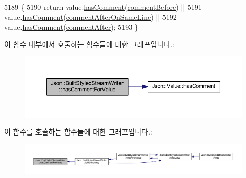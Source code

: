 \begin{DoxyCode}
5189                                                                    \{
5190   \textcolor{keywordflow}{return} value.\hyperlink{class_json_1_1_value_a65d8e3ab6a5871cbd019a3e0f0b944a3}{hasComment}(\hyperlink{namespace_json_a4fc417c23905b2ae9e2c47d197a45351a52f1733775460517b2ea6bedf4906d52}{commentBefore}) ||
5191          value.\hyperlink{class_json_1_1_value_a65d8e3ab6a5871cbd019a3e0f0b944a3}{hasComment}(\hyperlink{namespace_json_a4fc417c23905b2ae9e2c47d197a45351a008a230a0586de54f30b76afe70fdcfa}{commentAfterOnSameLine}) ||
5192          value.\hyperlink{class_json_1_1_value_a65d8e3ab6a5871cbd019a3e0f0b944a3}{hasComment}(\hyperlink{namespace_json_a4fc417c23905b2ae9e2c47d197a45351ac5784ca53b12250888ddb642b06aebef}{commentAfter});
5193 \}
\end{DoxyCode}
이 함수 내부에서 호출하는 함수들에 대한 그래프입니다.\+:\nopagebreak
\begin{figure}[H]
\begin{center}
\leavevmode
\includegraphics[width=350pt]{struct_json_1_1_built_styled_stream_writer_a457c2f3c1e8c952caeb60e52477d0c9a_cgraph}
\end{center}
\end{figure}
이 함수를 호출하는 함수들에 대한 그래프입니다.\+:\nopagebreak
\begin{figure}[H]
\begin{center}
\leavevmode
\includegraphics[width=350pt]{struct_json_1_1_built_styled_stream_writer_a457c2f3c1e8c952caeb60e52477d0c9a_icgraph}
\end{center}
\end{figure}
\mbox{\label{struct_json_1_1_built_styled_stream_writer_a73e09692a2cfbd6e67836b060dc34a9f}} 

